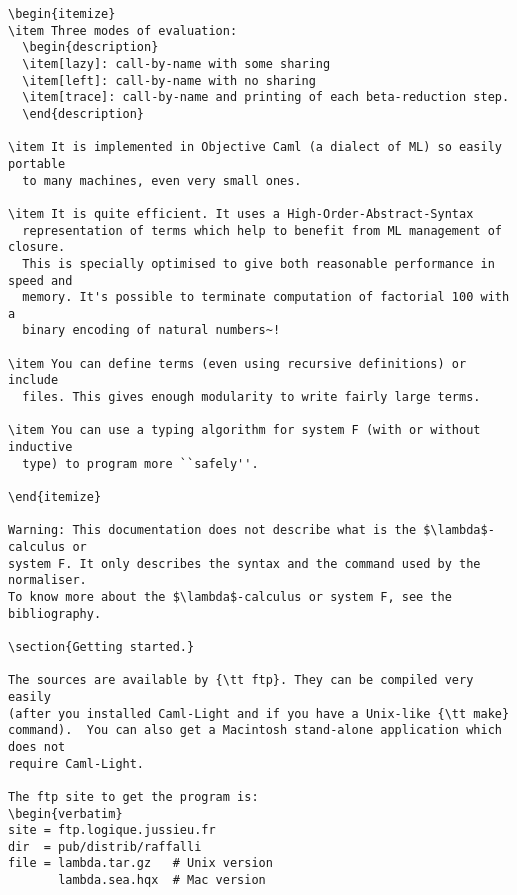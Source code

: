 {{\begin{verbatim}
\begin{itemize}
\item Three modes of evaluation:
  \begin{description}
  \item[lazy]: call-by-name with some sharing 
  \item[left]: call-by-name with no sharing 
  \item[trace]: call-by-name and printing of each beta-reduction step.
  \end{description}
  
\item It is implemented in Objective Caml (a dialect of ML) so easily portable
  to many machines, even very small ones.

\item It is quite efficient. It uses a High-Order-Abstract-Syntax
  representation of terms which help to benefit from ML management of closure.
  This is specially optimised to give both reasonable performance in speed and
  memory. It's possible to terminate computation of factorial 100 with a
  binary encoding of natural numbers~!
    
\item You can define terms (even using recursive definitions) or include
  files. This gives enough modularity to write fairly large terms.

\item You can use a typing algorithm for system F (with or without inductive
  type) to program more ``safely''.

\end{itemize}

Warning: This documentation does not describe what is the $\lambda$-calculus or
system F. It only describes the syntax and the command used by the normaliser.
To know more about the $\lambda$-calculus or system F, see the bibliography.
 
\section{Getting started.}

The sources are available by {\tt ftp}. They can be compiled very easily
(after you installed Caml-Light and if you have a Unix-like {\tt make}
command).  You can also get a Macintosh stand-alone application which does not
require Caml-Light.

The ftp site to get the program is:
\begin{verbatim}
site = ftp.logique.jussieu.fr
dir  = pub/distrib/raffalli
file = lambda.tar.gz   # Unix version
       lambda.sea.hqx  # Mac version 
\end{verbatim}

}}
